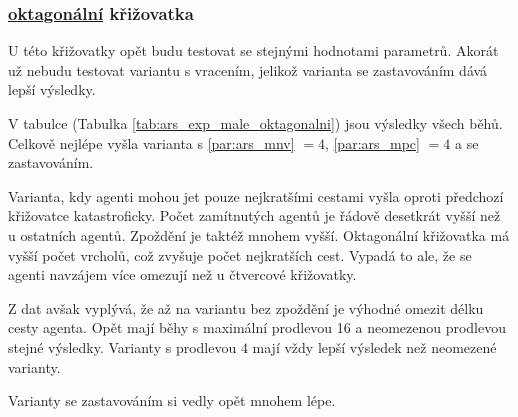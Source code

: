 \subsubsection{ \hyperref[subsec:oktagonalni_typ]{oktagonální} křižovatka}
\label{subsubsec:exp_ars_mala_oktagonalni_krizovatka}

U této křižovatky opět budu testovat se stejnými hodnotami parametrů.
Akorát už nebudu testovat variantu s vracením, jelikož varianta se zastavováním dává lepší výsledky.

V tabulce (Tabulka \ref{tab:ars_exp_male_oktagonalni}) jsou výsledky všech běhů.
Celkově nejlépe vyšla varianta s \ref{par:ars_mnv} $= 4$, \ref{par:ars_mpc} $=4$ a se zastavováním.

Varianta, kdy agenti mohou jet pouze nejkratšími cestami vyšla oproti předchozí křižovatce katastroficky.
Počet zamítnutých agentů je řádově desetkrát vyšší než u ostatních agentů.
Zpoždění je taktéž mnohem vyšší.
Oktagonální křižovatka má vyšší počet vrcholů, což zvyšuje počet nejkratších cest.
Vypadá to ale, že se agenti navzájem více omezují než u čtvercové křižovatky.

Z dat avšak vyplývá, že až na variantu bez zpoždění je výhodné omezit délku cesty agenta.
Opět mají běhy s maximální prodlevou 16 a neomezenou prodlevou stejné výsledky.
Varianty s prodlevou $4$ mají vždy lepší výsledek než neomezené varianty.

Varianty se zastavováním si vedly opět mnohem lépe.

